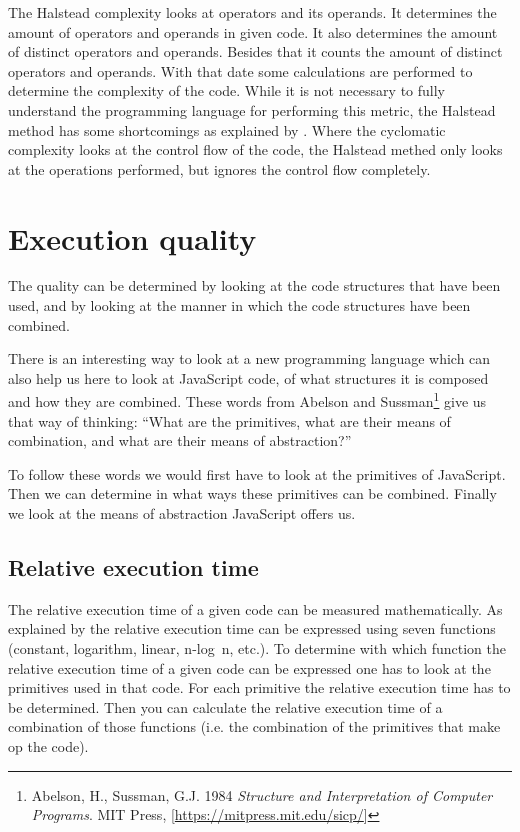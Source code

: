 \documentclass{article}
\begin{document}
The Halstead complexity looks at operators and its operands. It determines the
amount of operators and operands in given code. It also determines the amount
of distinct operators and operands.  Besides that it counts the amount of
distinct operators and operands. With that date some calculations are performed
to determine the complexity of the code. While it is not necessary to fully
understand the programming language for performing this metric, the Halstead
method has some shortcomings as explained by \citet{yu2010survey}. Where the
cyclomatic complexity looks at the control flow of the code, the Halstead
methed only looks at the operations performed, but ignores the control flow
completely.

\section{Execution quality}

The quality can be determined by looking at the code structures that have been
used, and by looking at the manner in which the code structures have been
combined.

There is an interesting way to look at a new programming language which can
also help us here to look at JavaScript code, of what structures it is composed
and how they are combined. These words from Abelson and
Sussman\footnote{Abelson, H., Sussman, G.J. 1984 {\em Structure and
Interpretation of Computer Programs}. MIT Press,
[\url{https://mitpress.mit.edu/sicp/}]} give us that way of thinking: ``What
are the primitives, what are their means of combination, and what are their
means of abstraction?''

To follow these words we would first have to look at the primitives of
JavaScript. Then we can determine in what ways these primitives can be
combined. Finally we look at the means of abstraction JavaScript offers us.

\subsection{Relative execution time}

The relative execution time of a given code can be measured mathematically. As
explained by \citet[Chapter 4]{goodrich2008data} the relative execution time
can be expressed using seven functions (constant, logarithm, linear, n-log~n,
etc.). To determine with which function the relative execution time of a given
code can be expressed one has to look at the primitives used in that code. For
each primitive the relative execution time has to be determined. Then you can
calculate the relative execution time of a combination of those functions
(i.e. the combination of the primitives that make op the code).
\end{document}
